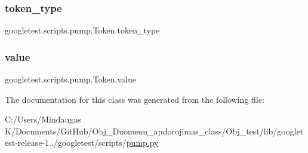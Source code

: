 \subsubsection{\texorpdfstring{token\_type}{token\_type}}
{\footnotesize\ttfamily googletest.\+scripts.\+pump.\+Token.\+token\+\_\+type}

\mbox{\label{classgoogletest_1_1scripts_1_1pump_1_1_token_a5ffb04f116b6a260849e08c4c5cb2b76}} 
\subsubsection{\texorpdfstring{value}{value}}
{\footnotesize\ttfamily googletest.\+scripts.\+pump.\+Token.\+value}



The documentation for this class was generated from the following file\+:\begin{DoxyCompactItemize}
\item 
C\+:/\+Users/\+Mindaugas K/\+Documents/\+Git\+Hub/\+Obj\+\_\+\+Duomenu\+\_\+apdorojimas\+\_\+class/\+Obj\+\_\+test/lib/googletest-\/release-\/1../googletest/scripts/\mbox{\hyperlink{_obj__test_2lib_2googletest-release-1_88_81_2googletest_2scripts_2pump_8py}{pump.\+py}}\end{DoxyCompactItemize}
